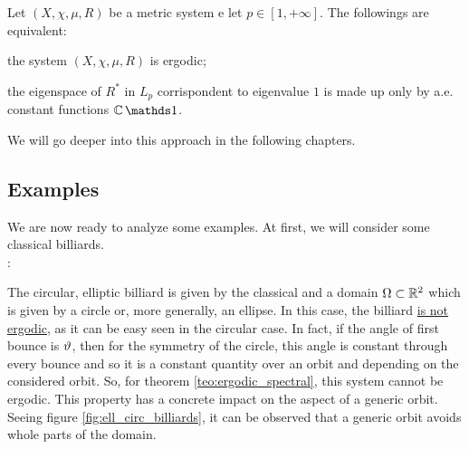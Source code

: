 \begin{nteo}
\label{teo:ergodic_spectral} 
Let $(X,\chi,\mu,R)$ be a metric system e let $p\in[1,+\infty]$. The followings are equivalent:
\begin{compactitem}
\item the system $(X,\chi,\mu,R)$ is ergodic;
\item the eigenspace of $R^{\ast}$ in $L_{p}$ corrispondent to eigenvalue $1$ is made up only by a.e. constant functions $\mathbb{C}\one$.
\end{compactitem}
\end{nteo}

We will go deeper into this  approach in the following chapters.


\subsection{Examples}

We are now ready to analyze some examples. At first, we will consider some classical billiards.\\[2mm]

:

\begin{nese}
The circular, elliptic billiard is given by the classical  and a domain $\Omega\subset\mathbb{R}^{2}$ which is given by a circle or, more generally, an ellipse. In this case, the billiard \underline{is not ergodic}, as it can be easy seen in the circular case. In fact, if the angle of first bounce is $\vartheta$, then for the symmetry of the circle, this angle is constant through every bounce and so it is a constant quantity over an orbit and depending on the considered orbit. So, for theorem \ref{teo:ergodic_spectral}, this system cannot be ergodic. This property has a concrete impact on the aspect of a generic orbit. Seeing figure \ref{fig:ell_circ_billiards}, it can be observed that a generic orbit avoids whole parts of the domain.  
\end{nese}


